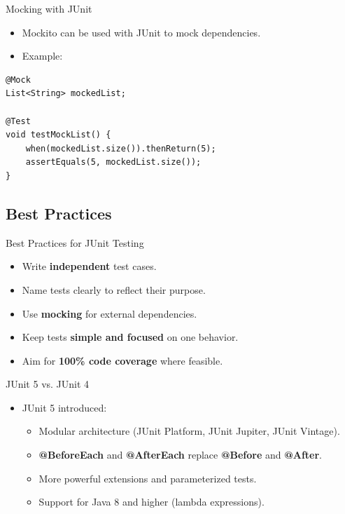 \documentclass{beamer}
\begin{document}
\begin{frame}[fragile]{Mocking with JUnit}
	\begin{itemize}
		\item Mockito can be used with JUnit to mock dependencies.
		\item Example:
	\end{itemize}
	\begin{lstlisting}
@Mock
List<String> mockedList;

@Test
void testMockList() {
    when(mockedList.size()).thenReturn(5);
    assertEquals(5, mockedList.size());
}
	\end{lstlisting}
\end{frame}

\subsection{Best Practices}

\begin{frame}{Best Practices for JUnit Testing}
	\begin{itemize}
		\item Write \textbf{independent} test cases.
		\item Name tests clearly to reflect their purpose.
		\item Use \textbf{mocking} for external dependencies.
		\item Keep tests \textbf{simple and focused} on one behavior.
		\item Aim for \textbf{100\% code coverage} where feasible.
	\end{itemize}
\end{frame}

\begin{frame}{JUnit 5 vs. JUnit 4}
	\begin{itemize}
		\item JUnit 5 introduced:
		\begin{itemize}
			\item Modular architecture (JUnit Platform, JUnit Jupiter, JUnit Vintage).
			\item \textbf{@BeforeEach} and \textbf{@AfterEach} replace \textbf{@Before} and \textbf{@After}.
			\item More powerful extensions and parameterized tests.
			\item Support for Java 8 and higher (lambda expressions).
		\end{itemize}
	\end{itemize}
\end{frame}
\end{document}
